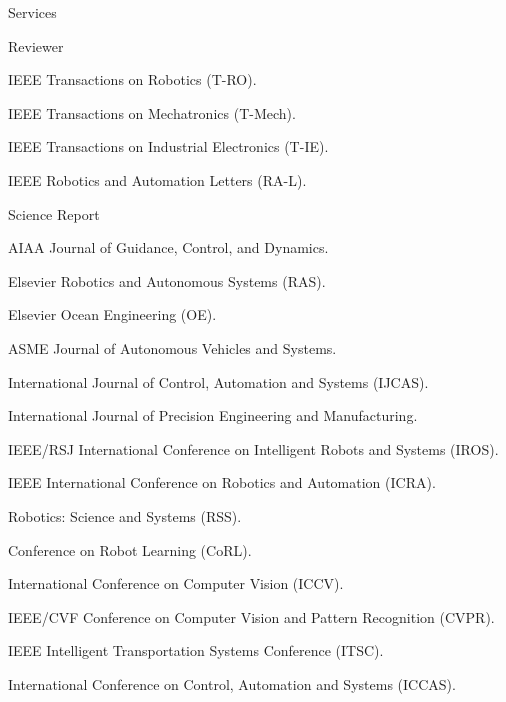 \begin{rSection}{Services}
\begin{rSubsection}{Reviewer}{}{}{}
  \item IEEE Transactions on Robotics (T-RO).
  \item IEEE Transactions on Mechatronics (T-Mech).
  \item IEEE Transactions on Industrial Electronics (T-IE).
  \item IEEE Robotics and Automation Letters (RA-L).
  \item Science Report
  \item AIAA Journal of Guidance, Control, and Dynamics.
  \item Elsevier Robotics and Autonomous Systems (RAS).
  \item Elsevier Ocean Engineering (OE).
  \item ASME Journal of Autonomous Vehicles and Systems.
  \item International Journal of Control, Automation and Systems (IJCAS).
  \item International Journal of Precision Engineering and Manufacturing.
  \item IEEE/RSJ International Conference on Intelligent Robots and Systems (IROS).
  \item IEEE International Conference on Robotics and Automation (ICRA).
  \item Robotics: Science and Systems (RSS).
  \item Conference on Robot Learning (CoRL).
  \item International Conference on Computer Vision (ICCV).
  \item IEEE/CVF Conference on Computer Vision and Pattern Recognition (CVPR).
  \item IEEE Intelligent Transportation Systems Conference (ITSC).
  \item International Conference on Control, Automation and Systems (ICCAS).
\end{rSubsection}


\end{rSection}
